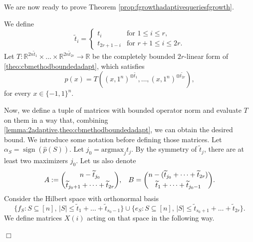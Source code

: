 \documentclass[11pt]{article}
\newcommand{\R}{\mathbb{R}} %
\newcommand{\1}{\mathbf{1}}
\DeclareMathOperator{\sign}{sign}
\theoremstyle{plain}
\theoremstyle{definition}
\theoremstyle{remark}
\renewenvironment{proof}[1][]{
    	\begin{trivlist}
     	\item[\hspace{\labelsep}{\em\noindent Proof#1:\/}]}
     	{{\hfill$\Box$}
    	\end{trivlist}
  }
\begin{document}
We are now ready to prove Theorem \ref{prop:fgrowthadaptivequeriesfgrowth}.
\begin{proof}
We define 
    \begin{equation*}
        \tilde t_i=\left\{\begin{array}{ll}
           t_i  & \text{for }1\leq i\leq r, \\
           t_{2r+1-i}  & \text{for } r+1\leq i\leq 2r.
        \end{array}\right.
\end{equation*}
    Let $T:\R^{2n\widetilde t_1}\times \dots\times \R^{2n\widetilde t_{2r}}\to \R$ be the completely bounded $2r$-linear form of \cref{theo:cbmethodboundedadapt}, which satisfies
    \begin{equation*}\label{eq:prestriction}
        p(x)=T((x,1^n)^{\otimes \widetilde{t_1}},\dots,(x,1^n)^{\otimes \widetilde{t_{2r}}}),
    \end{equation*}
    for every $x\in\{-1,1\}^n.$ 
    
    Now, we define a tuple of matrices with bounded operator norm and evaluate $T$ on them in a way that, combining \cref{lemma:2adaptive,theo:cbmethodboundedadapt}, we can obtain the desired bound. We introduce some notation before defining those matrices. Let $\alpha_S=\sign(\widehat p (S))$.
    Let $j_0=\text{argmax}_j t_j$. By the symmetry of $\widetilde t_j$, there are at least two maximizers $j_0.$ Let us also denote $$A:={n-\widetilde t_{j_0}\choose \widetilde t_{j_0+1}+\dots+\widetilde t_{2r}}, \hspace{0.3 cm}B={n-(\widetilde t_{j_0}+\dots+\widetilde t_{2r})\choose \widetilde t_1+\dots+\widetilde t_{j_0-1}}.$$
    Consider the  Hilbert space with orthonormal basis $$\{f_S:S\subseteq [n],\, |S|\leq \widetilde t_{1}+\dots+\widetilde t_{s_0-1}\}\cup \{e_S:S\subseteq [n],\, |S|\leq \widetilde t_{s_0+1}+\dots+\widetilde t_{2r}\}.$$
    We define matrices $X(i)$ acting on that space in the following way. 
   

\end{proof}
\end{document}
